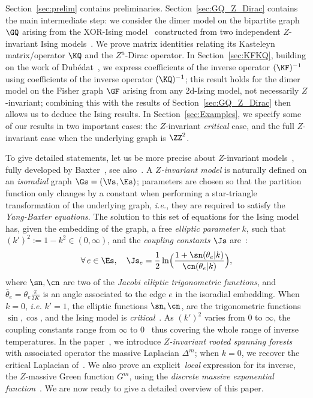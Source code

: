 \documentclass[a4paper,twoside,11pt]{article}
\begin{document}
Section~\ref{sec:prelim} contains preliminaries. 
Section~\ref{sec:GQ_Z_Dirac} contains the main intermediate step: we consider the dimer model on the bipartite graph $\GQ$
arising from the XOR-Ising model~\cite{WilsonXOR} constructed from two independent $Z$-invariant Ising models~\cite{Dubedat,BoutillierdeTiliere:XORloops}. 
We prove matrix 
identities relating its Kasteleyn matrix/operator $\KQ$ and the $Z^u$-Dirac operator.  In Section~\ref{sec:KFKQ}, building on the work of Dub\'edat~\cite{Dubedat}, 
we express coefficients of the inverse operator $(\KF)^{-1}$
using coefficients of the inverse operator $(\KQ)^{-1}$; this result holds for the dimer model on the Fisher graph $\GF$ arising from 
any 2d-Ising model, not necessarily $Z$-invariant; combining this with the results of Section~\ref{sec:GQ_Z_Dirac} then allows us to deduce the 
Ising results. In Section~\ref{sec:Examples}, we specify some of our results in two important cases: the $Z$-invariant \emph{critical} case, and the 
full $Z$-invariant case when the underlying graph is $\ZZ^2$.

To give detailed statements, let us be more precise about $Z$-invariant models~\cite{Onsager,Kennelly}, fully developed by
Baxter~\cite{Baxter:8V,Baxter:Zinv,Baxter:exactly}, see also~\cite{Perk:YB,Perk3,Perk4}. 
A \emph{$Z$-invariant model} is naturally defined on an 
\emph{isoradial} graph $\Gs=(\Vs,\Es)$; parameters are chosen so that
the partition function only changes by a constant when performing a star-triangle transformation of the underlying graph, 
\emph{i.e.}, they are required to satisfy the \emph{Yang-Baxter equations}. The solution to this set of equations for the Ising model
has, given the embedding of the graph, a free \emph{elliptic parameter} $k$, such that $(k')^2:=1-k^2\in(0,\infty)$, and 
the \emph{coupling constants} $\Js$ are~\cite{Baxter:exactly}:
\begin{equation*}
\forall\,e\in\Es,\quad \Js_e=\frac{1}{2}\ln\Bigl(\frac{1+\sn(\theta_e|k)}{\cn(\theta_e|k)}\Bigr),  
\end{equation*}
where $\sn,\cn$ are two of the \emph{Jacobi elliptic trigonometric functions}, and $\bar{\theta}_e=\theta_e \frac{\pi}{2K}$ is an angle
associated to the edge $e$ in the isoradial embedding. When $k=0$, \emph{i.e.} $k'=1$, the elliptic functions $\sn,\cn$, are the trigonometric 
functions $\sin,\cos$, and the Ising model is \emph{critical}~\cite{Li:critical,CimasoniDuminil,Lis}. 
As $(k')^2$ varies from $0$ to $\infty$, the coupling constants range from $\infty$ to $0$~\cite{BdtR2} thus covering the whole range of 
inverse temperatures. In the paper~\cite{BdTR1}, we introduce \emph{$Z$-invariant rooted spanning forests} with associated operator 
the massive Laplacian $\Delta^{m}$; when $k=0$, we recover the critical Laplacian of~\cite{Kenyon3}. We also prove an explicit~\emph{local}
expression for its inverse, the $Z$-massive Green function $G^m$, using the \emph{discrete massive exponential function}~\cite{BdTR1}.
We are now ready to give a detailed overview of this paper.
\end{document}
